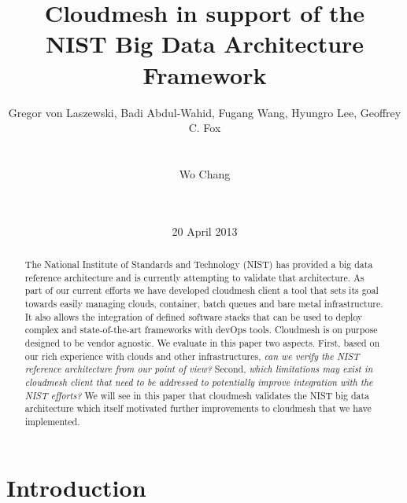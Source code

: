 

\newcommand{\TODO}[1]{\todo[inline,color=red!20]{#1}}

\title{Cloudmesh in support of the\\NIST Big Data Architecture Framework}


\author{
\alignauthor
Gregor von Laszewski, Badi Abdul-Wahid, Fugang Wang, Hyungro Lee, Geoffrey C. Fox\\
       \\
       \\
\alignauthor
Wo Chang\\
       \\
       \\
}
\date{20 April 2013}

\maketitle



\begin{abstract}

  The National Institute of Standards and Technology (NIST) has
  provided a big data reference architecture and is currently
  attempting to validate that architecture. As part of our current
  efforts we have developed cloudmesh client a tool that sets its goal
  towards easily managing clouds, container, batch queues and bare
  metal infrastructure. It also allows the integration of defined
  software stacks that can be used to deploy complex and
  state-of-the-art frameworks with devOps tools. Cloudmesh is on
  purpose designed to be vendor agnostic. We evaluate in this paper
  two aspects. First, based on our rich experience with clouds and
  other infrastructures, {\it can we verify the NIST reference
    architecture from our point of view?} Second, {\it which
    limitations may exist in cloudmesh client that need to be
    addressed to potentially improve integration with the NIST
    efforts?}  We will see in this paper that cloudmesh validates the
  NIST big data architecture which itself motivated further
  improvements to cloudmesh that we have implemented.
\end{abstract}


\section{Introduction}

